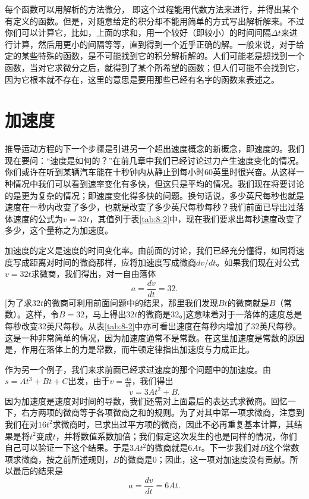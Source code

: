 \documentclass[12pt,oneside]{book}
\begin{document}
每个函数可以用解析的方法微分， 即这个过程能用代数方法来进行，并得出某个有定义的函数。但是，对随意给定的积分却不能用简单的方式写出解析解来。不过你们可以计算它，比如，上面的求和，用一个较好（即较小）的时间间隔$\Delta t$来进行计算，然后用更小的间隔等等，直到得到一个近乎正确的解。一般来说，对于给定的某些特殊的函数，是不可能找到它的积分解析解的。人们可能老是想找到一个函数，当对它求微分之后，就得到了某个所希望的函数；但人们可能不会找到它，因为它根本就不存在，这里的意思是要用那些已经有名字的函数来表述之。




\section{加速度}
推导运动方程的下一个步骤是引进另一个超出速度概念的新概念，即速度的。我们现在要问：“速度是如何的？”在前几章中我们已经讨论过力产生速度变化的情况。你们或许在听到某辆汽车能在十秒钟内从静止到每小时60英里时很兴奋。从这样一种情况中我们可以看到速率变化有多快，但这只是平均的情况。我们现在将要讨论的是更为复杂的情况；即速度变化得多快的问题。换句话说，多少英尺每秒也就是速度在一秒内改变了多少，也就是改变了多少英尺每秒每秒？我们前面已导出过落体速度的公式为$v=32t$，其值列于表\ref{tab:8-2}中，现在我们要求出每秒速度改变了多少，这个量称之为加速度。

加速度的定义是速度的时间变化率。由前面的讨论，我们已经充分懂得，如同将速度写成距离对时间的微商那样，应将加速度写成微商$dv/dt$。如果我们现在对公式$v=32t$求微商，我们得出，对一自由落体
\begin{equation}
\label{Eq:I:8:9}
a=\frac{dv}{dt}=32.
\end{equation}
[为了求$32t$的微商可利用前面问题中的结果，那里我们发现$Bt$的微商就是$B$（常数）。这样，令$B=32$，马上得出$32t$的微商是32。]这意味着对于一落体的速度总是每秒改变32英尺每秒。从表\ref{tab:8-2}中亦可看出速度在每秒内增加了32英尺每秒。这是一种非常简单的情况，因为加速度通常不是常数。在这里加速度是常数的原因是，作用在落体上的力是常数，而牛顿定律指出加速度与力成正比。

作为另一个例子，我们来求前面已经求过速度的那个问题中的加速度。由$s=At^3+Bt+C$出发，由于$v=\frac{ds}{dt}$，我们得出
\begin{equation*}
v=3At^2+B.
\end{equation*}
因为加速度是速度对时间的导数，我们还需对上面最后的表达式求微商。回忆一下，右方两项的微商等于各项微商之和的规则。为了对其中第一项求微商，注意到我们在对$16t^2$求微商时，已求出过平方项的微商，因此不必再重复基本计算，其结果是将$t^2$变成$t$，并将数值系数加倍；我们假定这次发生的也是同样的情况，你们自己可以验证一下这个结果。于是$3At^2$的微商就是$6At$。下一步我们对$B$这个常数项求微商，按之前所述规则，$B$的微商是0；因此，这一项对加速度没有贡献。所以最后的结果是
\begin{equation*}
a=\frac{dv}{dt}=6At.
\end{equation*}
\end{document}
